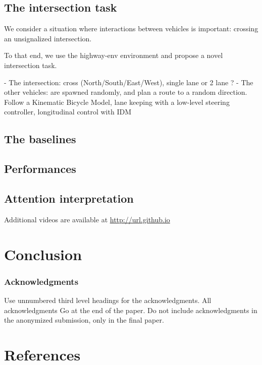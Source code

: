 \documentclass{article}
\begin{document}
\subsection{The intersection task}

We consider a situation where interactions between vehicles is important: crossing an unsignalized intersection.

To that end, we use the highway-env environment and propose a novel intersection task.

- The intersection: cross (North/South/East/West), single lane or 2 lane ?
- The other vehicles: are spawned randomly, and plan a route to a random direction.
Follow a Kinematic Bicycle Model, lane keeping with a low-level steering controller, longitudinal control with IDM


\subsection{The baselines}
\subsection{Performances}
\subsection{Attention interpretation}

Additional videos are available at \url{http://url.github.io}

\section{Conclusion}

\subsubsection*{Acknowledgments}

Use unnumbered third level headings for the acknowledgments. All acknowledgments
Go at the end of the paper. Do not include acknowledgments in the anonymized
submission, only in the final paper.

\section*{References}
\end{document}
